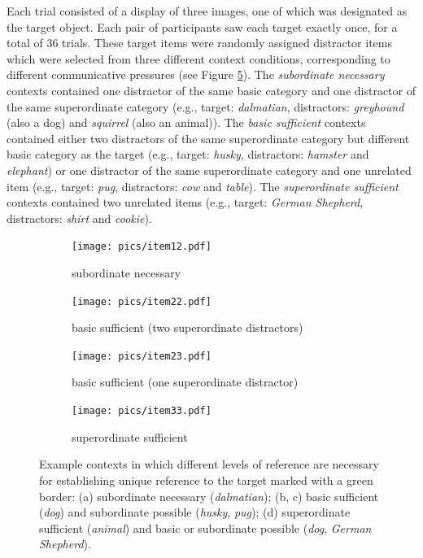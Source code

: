 \documentclass[11pt]{article}
\newcommand{\figref}[1]{Figure \ref{#1}}
\begin{document}
Each trial consisted of a display of three images, one of which was designated as the target object. Each pair of participants saw each target exactly once, for a total of 36 trials. These target items were randomly assigned distractor items which were selected from three different context conditions, corresponding to different communicative pressures (see \figref{fig:dogcontexts}). The \emph{subordinate necessary} contexts contained one distractor of the same basic category and one distractor of the same superordinate category (e.g., target: \emph{dalmatian}, distractors: \emph{greyhound} (also a dog) and \emph{squirrel} (also an animal)). The \emph{basic sufficient} contexts contained either two distractors of the same superordinate category but different basic category as the target (e.g., target: \emph{husky}, distractors: \emph{hamster} and \emph{elephant}) or one distractor of the same superordinate category and one unrelated item (e.g., target: \emph{pug}, distractors: \emph{cow} and \emph{table}). The \emph{superordinate sufficient} contexts contained two unrelated items (e.g., target: \emph{German Shepherd}, distractors: \emph{shirt} and \emph{cookie}). 

\begin{figure}
	\begin{subfigure}{.5\textwidth}
		\centering
		\texttt{[image: pics/item12.pdf]}
		\caption{subordinate necessary}
		\label{fig:item12}
	\end{subfigure}
	\begin{subfigure}{.5\textwidth}
		\centering
		\texttt{[image: pics/item22.pdf]}
		\centering
		\caption{basic sufficient (two superordinate distractors)}
		\label{fig:item22}
	\end{subfigure}
	\begin{subfigure}{.5\textwidth}
		\centering
		\texttt{[image: pics/item23.pdf]}
		\caption{basic sufficient (one superordinate distractor)}
		\label{fig:item23}
	\end{subfigure}
	\begin{subfigure}{.5\textwidth}
		\centering
		\texttt{[image: pics/item33.pdf]}
		\centering
		\caption{superordinate sufficient}
		\label{fig:item33}
	\end{subfigure}
	\caption{Example contexts in which different levels of reference are necessary for establishing unique reference to the target marked with a green border: (a) subordinate necessary (\emph{dalmatian}); (b, c) basic sufficient (\emph{dog}) and subordinate possible (\emph{husky}, \emph{pug}); (d) superordinate sufficient (\emph{animal}) and basic or subordinate possible (\emph{dog}, \emph{German Shepherd}).}
	\label{fig:dogcontexts}
\end{figure}
\end{document}
